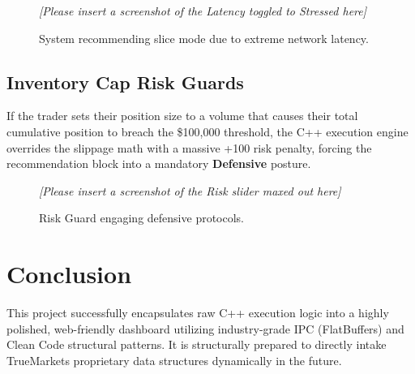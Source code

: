 \documentclass[11pt, a4paper]{article}
\begin{document}
\begin{figure}[H]
    \centering
    \textit{[Please insert a screenshot of the Latency toggled to Stressed here]}
    \caption{System recommending slice mode due to extreme network latency.}
\end{figure}

\subsection{Inventory Cap Risk Guards}
If the trader sets their position size to a volume that causes their total cumulative position to breach the \$100,000 threshold, the C++ execution engine overrides the slippage math with a massive +100 risk penalty, forcing the recommendation block into a mandatory \textbf{Defensive} posture.

\begin{figure}[H]
    \centering
    \textit{[Please insert a screenshot of the Risk slider maxed out here]}
    \caption{Risk Guard engaging defensive protocols.}
\end{figure}

\section{Conclusion}
This project successfully encapsulates raw C++ execution logic into a highly polished, web-friendly dashboard utilizing industry-grade IPC (FlatBuffers) and Clean Code structural patterns. It is structurally prepared to directly intake TrueMarkets proprietary data structures dynamically in the future.
\end{document}

